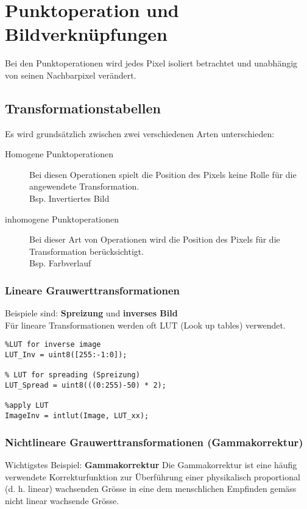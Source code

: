 
\section{Punktoperation und Bildverknüpfungen}
Bei den Punktoperationen wird jedes Pixel isoliert betrachtet und unabhängig von seinen Nachbarpixel verändert.
\subsection{Transformationstabellen}
Es wird grundsätzlich zwischen zwei verschiedenen Arten unterschieden:
\begin{description}
    \item[Homogene Punktoperationen] Bei diesen Operationen spielt die Position des Pixels keine Rolle für die angewendete Transformation.\\
    Bsp. Invertiertes Bild
    \item[inhomogene Punktoperationen] Bei dieser Art von Operationen wird die Position des Pixels für die Transformation berücksichtigt.\\
    Bsp. Farbverlauf
\end{description}

\subsubsection{Lineare Grauwerttransformationen}
Beispiele sind: \textbf{Spreizung} und \textbf{inverses Bild}\\
Für lineare Transformationen werden oft LUT (Look up tables) verwendet.
\begin{lstlisting}
%LUT for inverse image
LUT_Inv = uint8([255:-1:0]);

% LUT for spreading (Spreizung)
LUT_Spread = uint8(((0:255)-50) * 2);

%apply LUT
ImageInv = intlut(Image, LUT_xx);
\end{lstlisting}

\subsubsection{Nichtlineare Grauwerttransformationen (Gammakorrektur)}
Wichtigstes Beispiel: \textbf{Gammakorrektur}
Die Gammakorrektur ist eine häufig verwendete Korrekturfunktion zur Überführung einer physikalisch proportional (d. h. linear) wachsenden Grösse in eine dem menschlichen Empfinden gemäss nicht linear wachsende Grösse.

